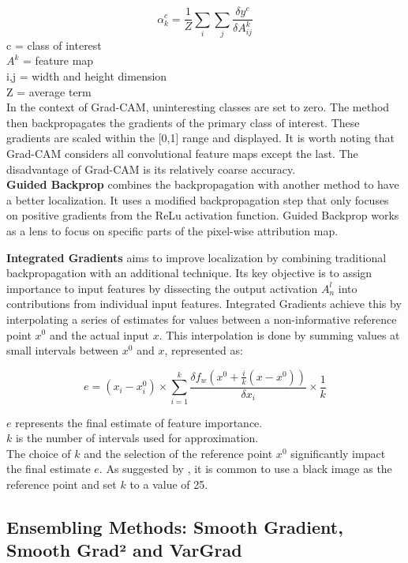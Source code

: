 $$\alpha^c_k = \frac{1}{Z} \sum_{i}\sum_{j} \frac{\delta y^c}{\delta A^k_{ij}}$$
c = class of interest\\
$A^k$ = feature map\\
i,j = width and height dimension\\
Z = average term\\

In the context of Grad-CAM, uninteresting classes are set to zero. The method then backpropagates the gradients of the primary class of interest. These gradients are scaled within the [0,1] range and displayed. It is worth noting that Grad-CAM considers all convolutional feature maps except the last. The disadvantage of Grad-CAM is its relatively coarse accuracy.
\\

\textbf{Guided Backprop} combines the backpropagation \cite{springenberg2015striving} with another method to have a better localization. It uses a modified backpropagation step that only focuses on positive gradients from the ReLu activation function. Guided Backprop works as a lens to focus on specific parts of the pixel-wise attribution map.

\textbf{Integrated Gradients} \cite {sundararajan2017axiomatic} aims to improve localization by combining traditional backpropagation with an additional technique. Its key objective is to assign importance to input features by dissecting the output activation $A^l_n$ into contributions from individual input features.
Integrated Gradients achieve this by interpolating a series of estimates for values between a non-informative reference point $x^0$ and the actual input $x$. This interpolation is done by summing values at small intervals between $x^0$ and $x$, represented as:

$$ e = (x_i - x^0_i) \times \sum_{i=1}^{k} \frac{\delta f_w(x^0 + \frac{i}{k}(x - x^0))}{\delta x_i} \times \frac{1}{k} $$

$e$ represents the final estimate of feature importance.\\
$k$ is the number of intervals used for approximation.\\

The choice of $k$ and the selection of the reference point $x^0$ significantly impact the final estimate $e$. As suggested by \cite {sundararajan2017axiomatic}, it is common to use a black image as the reference point and set $k$ to a value of 25.

\subsection{Ensembling Methods: Smooth Gradient, Smooth Grad² and VarGrad}

